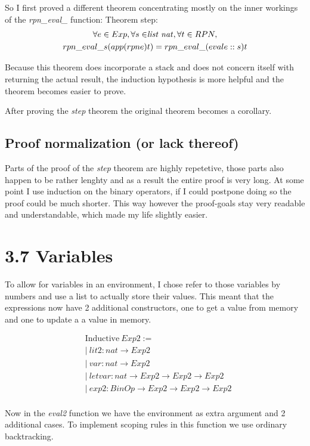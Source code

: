 \documentclass[10pt,a4paper,usenames,dvipnames]{article}
\begin{document}
So I first proved a different theorem concentrating mostly on the inner workings of the \emph{rpn\_eval\_} function: Theorem step:
\begin{multline*}
	\forall e \in Exp, \forall s \in $\emph{list nat}$, \forall t \in RPN, \\
	rpn\_eval\_ s (app (rpn e) t) = rpn\_eval\_ (eval e :: s) t
\end{multline*}

Because this theorem does incorporate a stack and does not concern itself with returning the actual result, the induction hypothesis is more helpful and the theorem becomes easier to prove.

After proving the \emph{step} theorem the original theorem becomes a corollary.

\subsection*{ Proof normalization (or lack thereof) }
Parts of the proof of the \emph{step} theorem are highly repetetive, those parts also happen to be rather lenghty and as a result the entire proof is very long. At some point I use induction on the binary operators, if I could postpone doing so the proof could be much shorter. This way however the proof-goals stay very readable and understandable, which made my life slightly easier.

\section*{ 3.7 Variables }
To allow for variables in an environment, I chose refer to those variables by numbers and use a list to actually store their values. This meant that the expressions now have 2 additional constructors, one to get a value from memory and one to update a a value in memory.

\begin{align*}
& \text{Inductive} \: Exp2 := \\
& | \: lit2 : nat \rightarrow Exp2 \\ 
& | \: var : nat \rightarrow Exp2 \\
& | \: letvar : nat \rightarrow Exp2 \rightarrow Exp2 \rightarrow Exp2 \\
& | \: exp2 : BinOp \rightarrow Exp2 \rightarrow Exp2 \rightarrow Exp2 \\
\end{align*}

Now in the \emph{eval2} function we have the environment as extra argument and 2 additional cases. To implement scoping rules
in this function we use ordinary backtracking.
\end{document}
